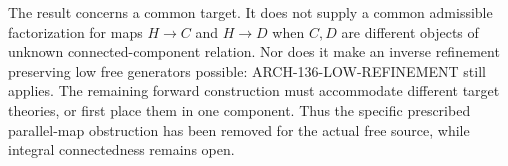 The result concerns a common target.  It does not supply a common
admissible factorization for maps $H\to C$ and $H\to D$ when
$C,D$ are different objects of unknown connected-component
relation.  Nor does it make an inverse refinement preserving low
free generators possible: ARCH-136-LOW-REFINEMENT still applies.
The remaining forward construction must accommodate different
target theories, or first place them in one component.  Thus the
specific prescribed parallel-map obstruction has been removed for
the actual free source, while integral connectedness remains open.
